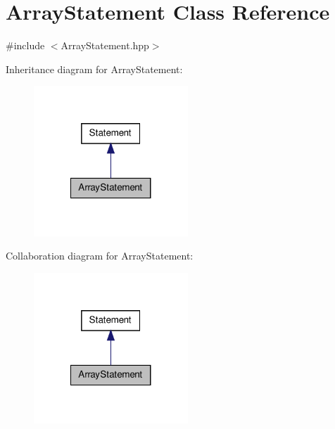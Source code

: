 \hypertarget{class_array_statement}{\section{Array\-Statement Class Reference}
\label{class_array_statement}
}


{\ttfamily \#include $<$Array\-Statement.\-hpp$>$}



Inheritance diagram for Array\-Statement\-:
\nopagebreak
\begin{figure}[H]
\begin{center}
\leavevmode
\includegraphics[width=164pt]{class_array_statement__inherit__graph}
\end{center}
\end{figure}


Collaboration diagram for Array\-Statement\-:
\nopagebreak
\begin{figure}[H]
\begin{center}
\leavevmode
\includegraphics[width=164pt]{class_array_statement__coll__graph}
\end{center}
\end{figure}
